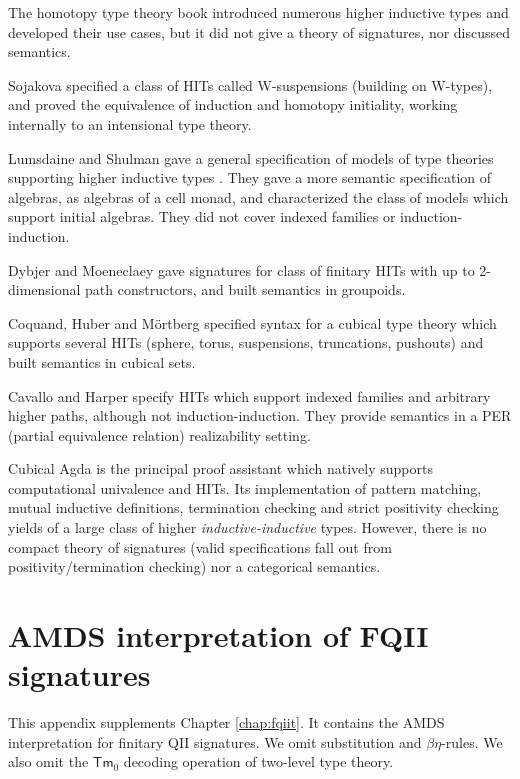 \documentclass[12pt,a4paper,twoside,openany]{book}
\theoremstyle{remark}
\theoremstyle{definition}
\theoremstyle{theorem}
\newcommand{\Tm}{\mathsf{Tm}}
\begin{document}
The homotopy type theory book \cite{hottbook} introduced numerous higher
inductive types and developed their use cases, but it did not give a theory of
signatures, nor discussed semantics.

Sojakova \cite{sojakova} specified a class of HITs called W-suspensions
(building on W-types), and proved the equivalence of induction and homotopy
initiality, working internally to an intensional type theory.

Lumsdaine and Shulman gave a general specification of models of type theories
supporting higher inductive types \cite{lumsdaineShulman}. They gave a more
semantic specification of algebras, as algebras of a cell monad, and
characterized the class of models which support initial algebras. They did not
cover indexed families or induction-induction.

Dybjer and Moeneclaey \cite{moeneclaey} gave signatures for class of finitary
HITs with up to 2-dimensional path constructors, and built semantics in
groupoids.

Coquand, Huber and Mörtberg \cite{cubicalhits} specified syntax for a cubical
type theory which supports several HITs (sphere, torus, suspensions,
truncations, pushouts) and built semantics in cubical sets.

Cavallo and Harper \cite{cubicalcomptt} specify HITs which support indexed
families and arbitrary higher paths, although not induction-induction. They
provide semantics in a PER (partial equivalence relation) realizability setting.

Cubical Agda \cite{cubicalagda} is the principal proof assistant which natively
supports computational univalence and HITs. Its implementation of pattern
matching, mutual inductive definitions, termination checking and strict
positivity checking yields of a large class of higher \emph{inductive-inductive}
types. However, there is no compact theory of signatures (valid specifications
fall out from positivity/termination checking) nor a categorical semantics.

\raggedbottom
\appendix

\chapter{AMDS interpretation of FQII signatures}
\label{app:fqii-amds}

This appendix supplements Chapter \ref{chap:fqiit}. It contains the AMDS
interpretation for finitary QII signatures. We omit substitution and
$\beta\eta$-rules. We also omit the $\Tm_0$ decoding operation of two-level type
theory.
\end{document}
